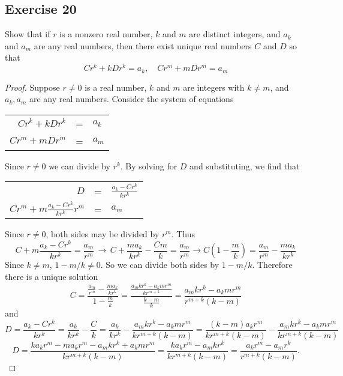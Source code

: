 \documentclass[14pt]{extarticle}
\newcommand{\dps}{\displaystyle}
\begin{document}
\subsection{Exercise 20}
Show that if $r$ is a nonzero real number, $k$ and $m$ are distinct integers, and $a_k$ and $a_m$ are any real
numbers, then there exist unique real numbers $C$ and $D$ so that
\[
    Cr^k + kDr^k = a_k, \,\,\,\,\,\, Cr^m + mDr^m = a_m
\]
\begin{proof}
    Suppose \(r \neq 0\) is a real number, $k$ and $m$ are integers with \(k \neq m\), and $a_k, a_m$ are any real numbers.
    Consider the system of equations
    \begin{center}
        \begin{tabular}{rcl}
            \(Cr^k + kDr^k\) & = & \(a_k\) \\
            \(Cr^m + mDr^m\) & = & \(a_m\)
        \end{tabular}
    \end{center}
    Since $r \neq 0$ we can divide by $r^k$. By solving for $D$ and substituting, we find that
    \begin{center}
        \begin{tabular}{rcl}
            \(D\)                                         & = & \(\dps \frac{a_k - Cr^k}{kr^k}\) \\
            \(\dps Cr^m + m \frac{a_k - Cr^k}{kr^k} r^m\) & = & \(a_m\)
        \end{tabular}
    \end{center}
    Since \(r \neq 0\), both sides may be divided by $r^m$.
    Thus
    \[
        C + m \frac{a_k - Cr^k}{kr^k} = \frac{a_m}{r^m} \, \to \,
        C + \frac{ma_k}{kr^k} - \frac{Cm}{k} = \frac{a_m}{r^m} \to
        C\left(1 - \frac{m}{k}\right) = \frac{a_m}{r^m} - \frac{ma_k}{kr^k}
    \]
    Since $k \neq m$, $1 - m/k \neq 0$. So we can divide both sides by $1 - m/k$. Therefore there is a unique solution
    \[
        C = \frac{\dps \frac{a_m}{r^m} - \frac{ma_k}{kr^k}}{\dps 1 - \frac{m}{k}}
        = \frac{\dps \frac{a_m kr^k - a_k mr^m}{kr^{m+k}}}{\dps \frac{k - m}{k}}
        = \frac{a_m kr^k - a_k mr^m}{r^{m+k}(k-m)}
    \]
    and
    \[
        D = \frac{a_k - Cr^k}{kr^k} = \frac{a_k}{kr^k} - \frac{C}{k}
        = \frac{a_k}{kr^k} - \frac{a_m kr^k - a_k mr^m}{kr^{m+k}(k-m)}
        = \frac{(k-m)a_k r^m}{kr^{m+k}(k-m)} - \frac{a_m kr^k - a_k mr^m}{kr^{m+k}(k-m)}
    \]
    \[
        D = \frac{ka_k r^m - ma_k r^m - a_m kr^k + a_k mr^m}{kr^{m+k}(k-m)}
        = \frac{ka_k r^m - a_m kr^k}{kr^{m+k}(k-m)}
        = \frac{a_k r^m - a_m r^k}{r^{m+k}(k-m)}.
    \]
\end{proof}
\end{document}
